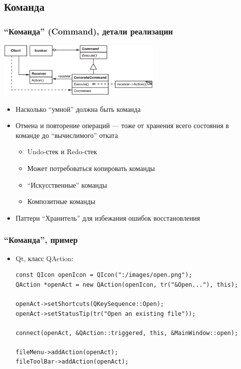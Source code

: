 \documentclass[xetex,mathserif,serif]{beamer}
\begin{document}
    \subsection{Команда}

    \begin{frame}
        \frametitle{``Команда'' (Command), детали реализации}
        \begin{center}
            \includegraphics[width=0.6\textwidth]{command.png}
        \end{center}
        \begin{itemize}
            \item Насколько ``умной'' должна быть команда
            \item Отмена и повторение операций --- тоже от хранения всего состояния в команде до ``вычислимого'' отката
            \begin{itemize}
                \item Undo-стек и Redo-стек
                \item Может потребоваться копировать команды
                \item ``Искусственные'' команды
                \item Композитные команды
            \end{itemize}
            \item Паттерн ``Хранитель'' для избежания ошибок восстановления
        \end{itemize}
    \end{frame}

    \begin{frame}[fragile]
        \frametitle{``Команда'', пример}
        \begin{itemize}
            \item Qt, класс QAction:
            \begin{verbatim}
const QIcon openIcon = QIcon(":/images/open.png");
QAction *openAct = new QAction(openIcon, tr("&Open..."), this);

openAct->setShortcuts(QKeySequence::Open);
openAct->setStatusTip(tr("Open an existing file"));

connect(openAct, &QAction::triggered, this, &MainWindow::open);

fileMenu->addAction(openAct);
fileToolBar->addAction(openAct);
            \end{verbatim}
        \end{itemize}
    \end{frame}
\end{document}
